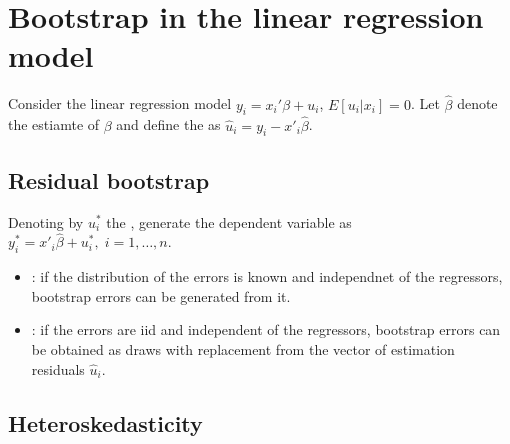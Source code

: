 \section{Bootstrap in the linear regression model}

Consider the linear regression model $y_i = x_i'\beta+u_i$, $E[u_i|x_i]=0$.
Let $\hat{\beta}$ denote the  estiamte of $\beta$ and define the  as $\hat{u}_i = y_i - x'_i\hat{\beta}$.

\subsection{Residual bootstrap}

Denoting by $u^*_i$ the , generate the dependent variable as $y^*_i = x'_i\hat{\beta}+u^*_i,\; i=1,\ldots,n$.
\begin{itemize}
    \item {}: if the distribution of the errors is known and independnet of the regressors,
    bootstrap errors can be generated from it. 
    \item {}: if the errors are iid and independent of the regressors,
    bootstrap errors can be obtained as draws with replacement from the vector of estimation residuals $\hat{u}_i$.
\end{itemize}

\subsection{Heteroskedasticity}

